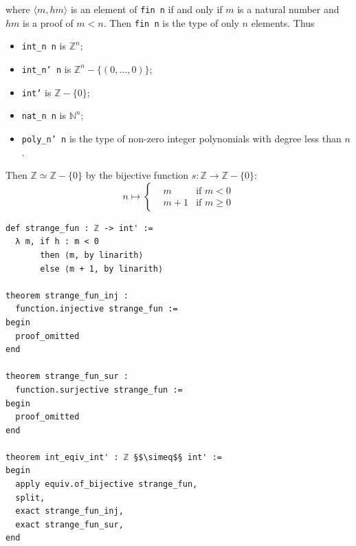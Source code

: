 \documentclass{report}
\theoremstyle{definition}
\newenvironment{code}{\captionsetup{type=listing}}{}
\begin{document}
where  $\langle m, hm\rangle$ is an element of {\tt \small fin n} if and only if $m$ is a natural number and $hm$ is a proof of $m < n$. Then {\tt \small fin n} is the type of only $n$ elements. Thus
\begin{itemize}
  \item {\tt \small int\_n n} is $\mathbb Z^n$;
  \item {\tt \small int\_n' n} is $\mathbb Z^n-\{(0,\dots,0)\}$;
  \item {\tt \small int'} is $\mathbb Z-\{0\}$;
  \item {\tt \small nat\_n n} is $\mathbb N^n$;
  \item {\tt \small poly\_n' n} is the type of non-zero integer polynomials with degree less than $n$.
\end{itemize}

Then $\mathbb Z\simeq \mathbb Z-\{0\}$ by the bijective function $s:\mathbb Z\to \mathbb Z-\{0\}$:
\begin{equation*}
n\mapsto\left\{
\begin{aligned}
& m & \text{if }m < 0\\
& m + 1 & \text{if }m \ge 0
\end{aligned}
\right.
\end{equation*}
\begin{code}
\begin{verbatim}
def strange_fun : ℤ -> int' := 
  λ m, if h : m < 0 
       then ⟨m, by linarith⟩ 
       else ⟨m + 1, by linarith⟩

theorem strange_fun_inj : 
  function.injective strange_fun :=
begin
  proof_omitted
end

theorem strange_fun_sur : 
  function.surjective strange_fun :=
begin
  proof_omitted
end

theorem int_eqiv_int' : ℤ §$\simeq$§ int' :=
begin
  apply equiv.of_bijective strange_fun,
  split,
  exact strange_fun_inj,
  exact strange_fun_sur,
end
\end{verbatim}
\caption{$\mathbb Z\simeq \mathbb Z-\{0\}$}
\end{code}
\end{document}
